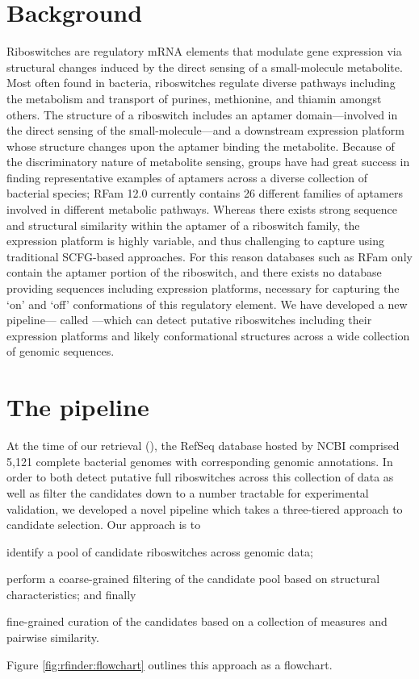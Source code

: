 \section{Background}
\label{sec:rfinder:bkgrnd}

Riboswitches are regulatory mRNA elements that modulate gene expression via
structural changes induced by the direct sensing of a small-molecule metabolite.
Most often found in bacteria, riboswitches regulate diverse pathways including the
metabolism and transport of purines, methionine, and thiamin amongst others. The
structure of a riboswitch includes an aptamer domain---involved in the direct
sensing of the small-molecule---and a downstream expression platform whose
structure changes upon the aptamer binding the metabolite. Because of the
discriminatory nature of metabolite sensing, groups have had great success in
finding representative examples of aptamers across a diverse collection of
bacterial species; RFam 12.0 currently contains 26 different families of aptamers
involved in different metabolic pathways. Whereas there exists strong sequence and
structural similarity within the aptamer of a riboswitch family, the expression
platform is highly variable, and thus challenging to capture using traditional
SCFG-based approaches. For this reason databases such as RFam only contain the aptamer
portion of the riboswitch, and there exists no database providing sequences
including expression platforms, necessary for capturing the `on' and `off'
conformations of this regulatory element. We have developed a new pipeline---
called \rfinder---which can detect putative riboswitches including their
expression platforms and likely conformational structures across a wide collection
of genomic sequences.

\section{The \rfinder pipeline}
\label{sec:rfinder:pipeline}

At the time of our retrieval (\fnaRetrievalTime), the RefSeq database hosted by
NCBI comprised 5,121 complete bacterial genomes with corresponding genomic
annotations. In order to both detect putative full riboswitches across this
collection of data as well as filter the candidates down to a number tractable for
experimental validation, we developed a novel pipeline which takes a three-tiered
approach to candidate selection. Our approach is to
\begin{inparaenum}[\em 1\upshape)]
\item identify a pool of candidate riboswitches across genomic data;
\item perform a coarse-grained filtering of the candidate pool based on structural
characteristics; and finally
\item fine-grained curation of the candidates based on a collection of measures
and pairwise similarity.
\end{inparaenum} Figure \ref{fig:rfinder:flowchart} outlines this approach as a
flowchart.

